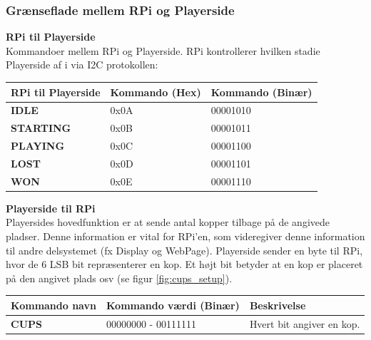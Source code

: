 \documentclass[Arkitektur/System_main.tex]{subfiles}
\begin{document}
\subsubsection{Grænseflade mellem RPi og Playerside} \label{sec:RPi_Playerside_com}

\textbf{RPi til Playerside}
\\Kommandoer mellem RPi og Playerside. RPi kontrollerer hvilken stadie Playerside af i via I2C protokollen: 
\begin{table}[H]
\centering
\begin{tabular}{|L{0.3\textwidth}|L{0.3\textwidth}|L{0.3\textwidth}|}
\hline
\textbf{RPi til Playerside} & \textbf{Kommando (Hex)} & \textbf{Kommando (Binær)} \\ \hline
\textbf{IDLE} & 0x0A & 00001010 \\ \hline
\textbf{STARTING} & 0x0B & 00001011 \\ \hline
\textbf{PLAYING} & 0x0C & 00001100 \\ \hline
\textbf{LOST} & 0x0D & 00001101 \\ \hline
\textbf{WON} & 0x0E & 00001110 \\ \hline
\end{tabular}

\end{table}

\textbf{Playerside til RPi}
\\Playersides hovedfunktion er at sende antal kopper tilbage på de angivede pladser. Denne information er vital for RPi'en, som videregiver denne information til andre delsystemet (fx Display og WebPage). 
Playerside sender en byte til RPi, hvor de 6 LSB bit repræsenterer en kop. Et højt bit betyder at en kop er placeret på den angivet plads osv (se figur \ref{fig:cups_setup}). 
\begin{table}[H]
\centering
\begin{tabular}{|L{0.3\textwidth}|L{0.3\textwidth}|L{0.3\textwidth}|}
\hline
\textbf{Kommando navn} & \textbf{Kommando værdi (Binær)} & \textbf{Beskrivelse} \\ \hline
\textbf{CUPS} & 00000000 - 00111111 & Hvert bit angiver en kop. \\ \hline
\end{tabular}
\end{table}
\end{document}
